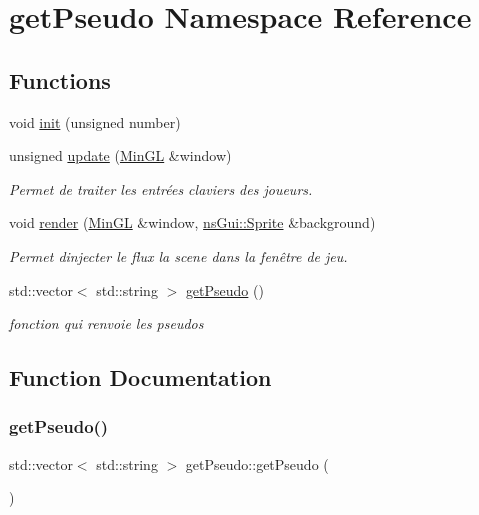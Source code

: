 \hypertarget{namespaceget_pseudo}{}\section{get\+Pseudo Namespace Reference}
\label{namespaceget_pseudo}
\subsection*{Functions}
\begin{DoxyCompactItemize}
\item 
void \hyperlink{namespaceget_pseudo_a2118924f3d3476ec90731262ec241f3f}{init} (unsigned number)
\item 
unsigned \hyperlink{namespaceget_pseudo_a16ca01380e0e64dfd93ca957ed916d79}{update} (\hyperlink{class_min_g_l}{Min\+GL} \&window)
\begin{DoxyCompactList}\small\item\em Permet de traiter les entrées claviers des joueurs. \end{DoxyCompactList}\item 
void \hyperlink{namespaceget_pseudo_ab63637cb902211344de3d87e00e3758b}{render} (\hyperlink{class_min_g_l}{Min\+GL} \&window, \hyperlink{classns_gui_1_1_sprite}{ns\+Gui\+::\+Sprite} \&background)
\begin{DoxyCompactList}\small\item\em Permet d\textquotesingle{}injecter le flux la scene dans la fenêtre de jeu. \end{DoxyCompactList}\item 
std\+::vector$<$ std\+::string $>$ \hyperlink{namespaceget_pseudo_adbd3aef743008ec70be6367604f99b1b}{get\+Pseudo} ()
\begin{DoxyCompactList}\small\item\em fonction qui renvoie les pseudos \end{DoxyCompactList}\end{DoxyCompactItemize}


\subsection{Function Documentation}
\mbox{\label{namespaceget_pseudo_adbd3aef743008ec70be6367604f99b1b}} 
\subsubsection{\texorpdfstring{get\+Pseudo()}{getPseudo()}}
{\footnotesize\ttfamily std\+::vector$<$ std\+::string $>$ get\+Pseudo\+::get\+Pseudo (\begin{DoxyParamCaption}{ }\end{DoxyParamCaption})}



